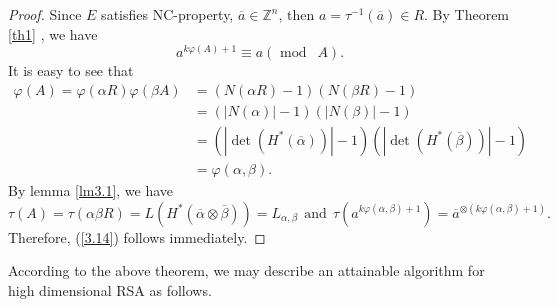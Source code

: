 \documentclass [11pt]{article}
\begin{document}
\begin{proof}
 Since $E$ satisfies   NC-property, $\overline{a} \in \mathbb{Z}^{n}$, then $a=\tau^{-1}(\overline{a}) \in R$. By Theorem \ref{th1} , we have
$$
a^{k \varphi(A)+1} \equiv a ( \text { mod }\ \  A ).
$$
It is easy to see that
$$
\begin{aligned}
\varphi(A)=\varphi(\alpha R) \varphi(\beta A)&=(N(\alpha R)-1)(N(\beta R)-1) \\
&=(|N(\alpha)|-1)(|N(\beta)|-1) \\
&=\left(\left|\operatorname{det}\left(H^{*}(\overline{\alpha})\right)\right|-1\right)\left(\left|\operatorname{det}\left(H^{*}(\overline{\beta})\right)\right|-1\right) \\
&=\varphi(\alpha, \beta).
\end{aligned}
$$
By lemma \ref{lm3.1}, we have
$$
\tau(A)=\tau(\alpha \beta R)= L\left(H^{*}(\overline{\alpha}\otimes \overline{\beta})\right)=L_{\alpha, \beta}
\ \ \text{and}\ \
\tau\left(a^{k \varphi(\alpha,\beta)+1}\right)=\overline{a}^{\otimes(k\varphi(\alpha, \beta)+1)}.
$$
Therefore, (\ref{3.14}) follows immediately.
\end{proof}



According to the above theorem, we may describe an attainable algorithm for high dimensional RSA as follows.
\end{document}
